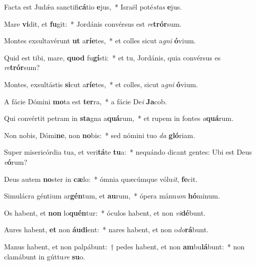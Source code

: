 ﻿\item Facta est Judǽa sanctifi\textbf{cá}tio \textbf{e}jus,~* Israël poté\textit{stas} \textbf{e}jus.

\item Mare \textbf{vi}dit, et \textbf{fu}git:~* Jordánis convérsus est \textit{re}\textbf{trór}sum.

\item Montes exsultavérunt \textbf{ut} a\textbf{rí}\textbf{e}tes,~* et colles sicut a\textit{gni} \textbf{ó}vium.

\item Quid est tibi, mare, \textbf{quod} fu\textbf{gí}sti:~* et tu, Jordánis, quia convérsus es \textit{re}\textbf{trór}sum?

\item Montes, exsultástis \textbf{si}cut a\textbf{rí}\textbf{e}tes,~* et colles, sicut a\textit{gni} \textbf{ó}vium.

\item A fácie Dómini \textbf{mo}ta est \textbf{ter}ra,~* a fácie De\textit{i} \textbf{Ja}cob.

\item Qui convértit petram in \textbf{sta}gna a\textbf{quá}rum,~* et rupem in fontes \textit{a}\textbf{quá}rum.

\item Non nobis, Dómi\textbf{ne}, non \textbf{no}bis:~* sed nómini tuo \textit{da} \textbf{gló}riam.

\item Super misericórdia tua, et veri\textbf{tá}te \textbf{tu}a:~* nequándo dicant gentes: Ubi est Deus \textit{e}\textbf{ó}rum?

\item Deus autem \textbf{no}ster in \textbf{cæ}lo:~* ómnia quæcúmque vólu\textit{it}, \textbf{fe}cit.

\item Simulácra géntium ar\textbf{gén}tum, et \textbf{au}rum,~* ópera mánu\textit{um} \textbf{hó}minum.

\item Os habent, et \textbf{non} lo\textbf{quén}tur:~* óculos habent, et non \textit{vi}\textbf{dé}bunt.

\item Aures habent, \textbf{et} non \textbf{áu}\textbf{di}ent:~* nares habent, et non o\textit{do}\textbf{rá}bunt.

\item Manus habent, et non palpábunt:~† pedes habent, et non \textbf{am}bu\textbf{lá}bunt:~* non clamábunt in gúttu\textit{re} \textbf{su}o.

